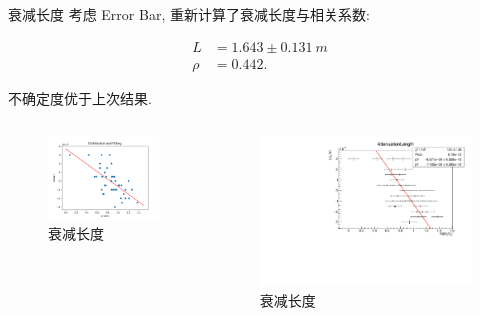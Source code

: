 \documentclass[10pt]{beamer}
\begin{document}
\begin{frame}[label={sec:org9d33d13}]{衰减长度}
考虑 Error Bar, 重新计算了衰减长度与相关系数:

\begin{align}
\label{eq:3}
L &= 1.643 \pm \qty{0.131}{m} \\
\rho &= 0.442.
\end{align}

不确定度优于上次结果.

\begin{columns}
\begin{column}{0.5\columnwidth}
\begin{figure}[htbp]
\centering
\includegraphics[width=1.0\textwidth]{../../DetectorPerform/AttenuationLength/figs/Dist.png}
\caption{衰减长度}
\end{figure}
\end{column}

\begin{column}{0.5\columnwidth}
\begin{figure}[htbp]
\centering
\includegraphics[width=1.0\textwidth]{../../DetectorPerform/AttenuationLength/figs/AttenuationLength.pdf}
\caption{衰减长度}
\end{figure}
\end{column}
\end{columns}
\end{frame}
\end{document}
